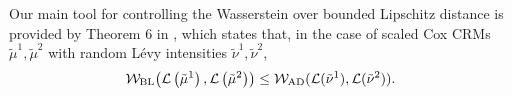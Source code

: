 Our main tool for controlling the Wasserstein over bounded Lipschitz distance is provided by Theorem 6 in \cite{catalano2026merging}, which states that, in the case of scaled Cox CRMs $\tilde{\mu}^1, \tilde{\mu}^2$ with random L\'evy intensities $\tilde{\nu}^1, \tilde{\nu}^2$, 
\[
\mathcal{W}_{\mathrm{BL}}\!\left( \mathcal{L}\left(\tilde{\mu}^1\right), \mathcal{L}\left(\tilde{\mu}^2\right) \right) \leq
\mathcal{W}_{\mathrm{AD}}(\mathcal{L}(\tilde{\nu}^1), \mathcal{L}(\tilde{\nu}^2)).
 \]







